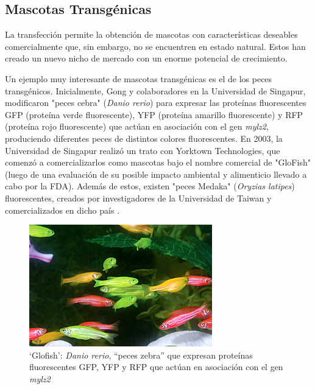 \documentclass[fleqn,10pt]{SelfArx} %
\begin{document}
\subsection{Mascotas Transgénicas}
    
    La transfección permite la obtención de mascotas con características deseables comercialmente que, sin embargo, no se encuentren en estado natural. Estos han creado un nuevo nicho de mercado con un enorme potencial de crecimiento. 
    
    Un ejemplo muy interesante de mascotas transgénicas es el de los peces transgénicos. Inicialmente, Gong y colaboradores en la Universidad de Singapur, modificaron "peces cebra" (\textit{Danio rerio}) para expresar las proteínas fluorescentes GFP (proteína verde fluorescente), YFP (proteína amarillo fluorescente) y RFP (proteína rojo fluorescente) que actúan en asociación con el gen \textit{mylz2}, produciendo diferentes peces de distintos colores fluorescentes. En 2003, la Universidad de Singapur realizó un trato con Yorktown Technologies, que comenzó a comercializarlos como mascotas bajo el nombre comercial de "GloFish" (luego de una evaluación de su posible impacto ambiental y alimenticio llevado a cabo por la FDA)\cite{food2003fda}. Además de estos, existen "peces Medaka" (\textit{Oryzias latipes}) fluorescentes, creados por investigadores de la Universidad de Taiwan y comercializados en dicho país \cite{gong2003development, espinoza2012reproduccion, scotto2013primera}.
    
\begin{figure}[ht]\centering
\includegraphics[width=\linewidth]{images/danio}
\caption{`Glofish': \textit{Danio rerio}, ``peces zebra'' que expresan proteínas fluorescentes GFP, YFP y RFP que actúan en asociación con el gen \textit{mylz2} \cite{gong2003development, fox2008fda}}
\end{figure}    
    
\end{document}
